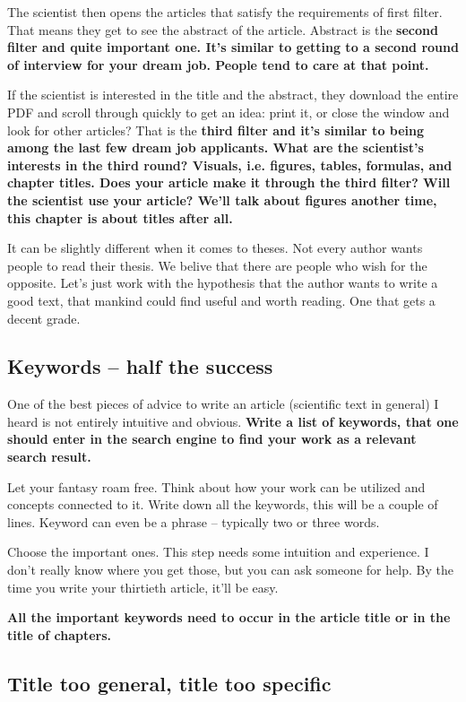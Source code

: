 The scientist then opens the articles that satisfy the requirements of first filter. That means they get to see the abstract of the article. Abstract is the \bf second filter \rm and quite important one. It's similar to getting to a second round of interview for your dream job. People tend to care at that point.

If the scientist is interested in the title and the abstract, they download the entire PDF and scroll through quickly to get an idea: print it, or close the window and look for other articles? That is the \bf third filter \rm and it's similar to being among the last few dream job applicants. What are the scientist's interests in the third round? Visuals, i.e. figures, tables, formulas, and chapter titles. Does your article make it through the third filter? Will the scientist use your article? We'll talk about figures another time, this chapter is about titles after all.

It can be slightly different when it comes to theses. Not every author wants people to read their thesis. We belive that there are people who wish for the opposite. Let's just work with the hypothesis that the author wants to write a good text, that mankind could find useful and worth reading. One that gets a decent grade.


\subsection*{Keywords -- half the success}

One of the best pieces of advice to write an article (scientific text in general) I heard is not entirely intuitive and obvious.
\bf Write a list of keywords, that one should enter in the search engine to find your work as a relevant search result. \rm

Let your fantasy roam free. Think about how your work can be utilized and concepts connected to it. Write down all the keywords, this will be a couple of lines. Keyword can even be a phrase -- typically two or three words.

Choose the important ones. This step needs some intuition and experience. I don't really know where you get those, but you can ask someone for help. By the time you write your thirtieth article, it'll be easy.

\bf All the important keywords need to occur in the article title or in the title of chapters. \rm 

\subsection*{Title too general, title too specific}

